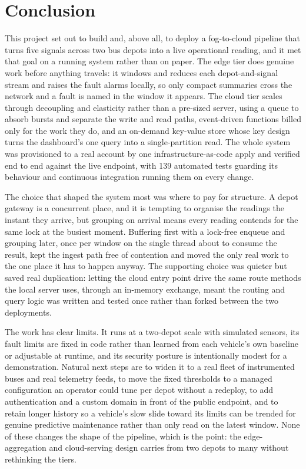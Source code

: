 \documentclass[conference]{IEEEtran}
\begin{document}
\section{Conclusion}

This project set out to build and, above all, to deploy a fog-to-cloud pipeline that turns five signals across two bus depots into a live operational reading, and it met that goal on a running system rather than on paper. The edge tier does genuine work before anything travels: it windows and reduces each depot-and-signal stream and raises the fault alarms locally, so only compact summaries cross the network and a fault is named in the window it appears. The cloud tier scales through decoupling and elasticity rather than a pre-sized server, using a queue to absorb bursts and separate the write and read paths, event-driven functions billed only for the work they do, and an on-demand key-value store whose key design turns the dashboard's one query into a single-partition read. The whole system was provisioned to a real account by one infrastructure-as-code apply and verified end to end against the live endpoint, with 139 automated tests guarding its behaviour and continuous integration running them on every change.

The choice that shaped the system most was where to pay for structure. A depot gateway is a concurrent place, and it is tempting to organise the readings the instant they arrive, but grouping on arrival means every reading contends for the same lock at the busiest moment. Buffering first with a lock-free enqueue and grouping later, once per window on the single thread about to consume the result, kept the ingest path free of contention and moved the only real work to the one place it has to happen anyway. The supporting choice was quieter but saved real duplication: letting the cloud entry point drive the same route methods the local server uses, through an in-memory exchange, meant the routing and query logic was written and tested once rather than forked between the two deployments.

The work has clear limits. It runs at a two-depot scale with simulated sensors, its fault limits are fixed in code rather than learned from each vehicle's own baseline or adjustable at runtime, and its security posture is intentionally modest for a demonstration. Natural next steps are to widen it to a real fleet of instrumented buses and real telemetry feeds, to move the fixed thresholds to a managed configuration an operator could tune per depot without a redeploy, to add authentication and a custom domain in front of the public endpoint, and to retain longer history so a vehicle's slow slide toward its limits can be trended for genuine predictive maintenance rather than only read on the latest window. None of these changes the shape of the pipeline, which is the point: the edge-aggregation and cloud-serving design carries from two depots to many without rethinking the tiers.
\end{document}
